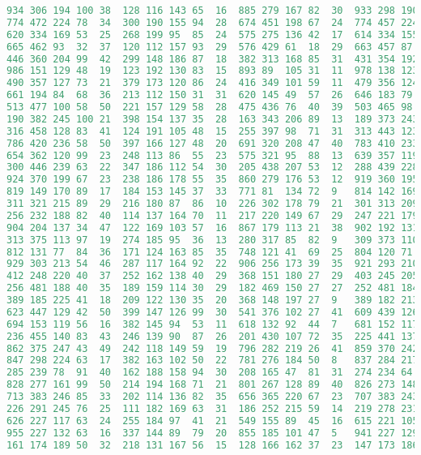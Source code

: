 \begin{lstlisting}[language=Python]
934	306	194	100	38	128	116	143	65	16	885	279	167	82	30	933	298	190	95	28
774	472	224	78	34	300	190	155	94	28	674	451	198	67	24	774	457	224	76	31
620	334	169	53	25	268	199	95	85	24	575	275	136	42	17	614	334	155	39	16
665	462	93	32	37	120	112	157	93	29	576	429	61	18	29	663	457	87	20	33
446	360	204	99	42	299	148	186	87	18	382	313	168	85	31	431	354	192	96	30
986	151	129	48	19	123	192	130	83	15	893	89	105	31	11	978	138	123	35	11
490	357	127	73	21	379	173	120	86	24	416	349	101	59	11	479	356	124	58	6
661	194	84	68	36	213	112	150	31	31	620	145	49	57	26	646	183	79	61	36
513	477	100	58	50	221	157	129	58	28	475	436	76	40	39	503	465	98	54	40
190	382	245	100	21	398	154	137	35	28	163	343	206	89	13	189	373	243	97	17
316	458	128	83	41	124	191	105	48	15	255	397	98	71	31	313	443	123	83	41
786	420	236	58	50	397	166	127	48	20	691	320	208	47	40	783	410	233	43	35
654	362	120	99	23	248	113	86	55	23	575	321	95	88	13	639	357	119	90	17
300	446	239	63	22	347	186	112	54	30	205	438	207	53	12	288	439	228	53	12
924	370	199	67	23	238	186	178	55	35	860	279	176	53	12	919	360	195	55	13
819	149	170	89	17	184	153	145	37	33	771	81	134	72	9	814	142	169	88	12
311	321	215	89	29	216	180	87	86	10	226	302	178	79	21	301	313	209	79	16
256	232	188	82	40	114	137	164	70	11	217	220	149	67	29	247	221	179	77	30
904	204	137	34	47	122	169	103	57	16	867	179	113	21	38	902	192	131	24	35
313	375	113	97	19	274	185	95	36	13	280	317	85	82	9	309	373	110	91	19
812	131	77	84	36	171	124	163	85	35	748	121	41	69	25	804	120	71	70	23
929	303	213	54	46	287	117	164	92	22	906	256	173	39	35	921	293	210	54	34
412	248	220	40	37	252	162	138	40	29	368	151	180	27	29	403	245	205	35	32
256	481	188	40	35	189	159	114	30	29	182	469	150	27	27	252	481	184	39	33
389	185	225	41	18	209	122	130	35	20	368	148	197	27	9	389	182	213	36	3
623	447	129	42	50	399	147	126	99	30	541	376	102	27	41	609	439	126	30	40
694	153	119	56	16	382	145	94	53	11	618	132	92	44	7	681	152	117	50	2
236	455	140	83	43	246	139	90	87	26	201	430	107	72	35	225	441	137	83	33
862	375	247	43	49	242	118	149	59	19	796	282	219	26	41	859	370	242	28	41
847	298	224	63	17	382	163	102	50	22	781	276	184	50	8	837	284	217	58	10
285	239	78	91	40	162	188	158	94	30	208	165	47	81	31	274	234	64	83	26
828	277	161	99	50	214	194	168	71	21	801	267	128	89	40	826	273	148	93	40
713	383	246	85	33	202	114	136	82	35	656	365	220	67	23	707	383	243	83	32
226	291	245	76	25	111	182	169	63	31	186	252	215	59	14	219	278	231	71	12
626	227	117	63	24	255	184	97	41	21	549	155	89	45	16	615	221	105	63	16
955	227	132	63	16	337	144	89	79	20	855	185	101	47	5	941	227	129	63	10
161	174	189	50	32	218	131	167	56	15	128	166	162	37	23	147	173	186	36	20

\end{lstlisting}
